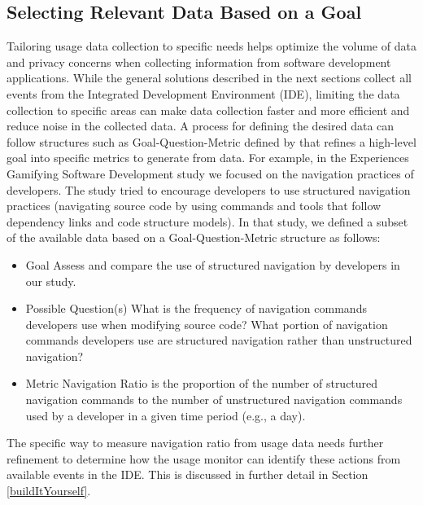 \subsection{Selecting Relevant Data Based on a Goal}
\label{SelectingData}
Tailoring usage data collection to specific needs helps optimize the volume of data and privacy concerns when collecting information from software development applications.  While the general solutions described in the next sections collect all events from the Integrated Development Environment (IDE), limiting the data collection to specific areas can make data collection faster and more efficient and reduce noise in the collected data.  A process for defining the desired data can follow structures such as Goal-Question-Metric defined by   that refines a high-level goal into specific metrics to generate from data.  For example, in the Experiences Gamifying Software Development \cite{SnipesExperiencesGamifyingSoftwareDevelopment} study we focused on the navigation practices of developers.  The study tried to encourage developers to use structured navigation practices (navigating source code by using commands and tools that follow dependency links and code structure models).  In that study, we defined a subset of the available data based on a Goal-Question-Metric structure as follows:
    \begin{itemize}
\item
	Goal
\subitem
	Assess and compare the use of structured navigation by developers in our study.
\item
	Possible Question(s)
\subitem
	What is the frequency of navigation commands developers use when modifying source code?
\subitem
	What portion of navigation commands developers use are structured navigation rather than unstructured navigation?
\item
	Metric
\subitem
	Navigation Ratio is the proportion of the number of structured navigation commands to the number of unstructured navigation commands used by a developer in a given time period (e.g., a day).

	    \end{itemize}

The specific way to measure navigation ratio from usage data needs further refinement to determine how the usage monitor can identify these actions from available events in the IDE. This is discussed in further detail in Section \ref{buildItYourself}.

